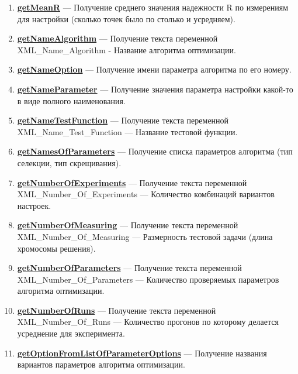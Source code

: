 \documentclass[a4paper,12pt]{article}
\begin{document}
\begin{enumerate}
	\item \textbf{\hyperref[getMeanR]{getMeanR}} --- Получение среднего значения надежности R по измерениям для настройки (сколько точек было по столько и усредняем).
	
	\item \textbf{\hyperref[getNameAlgorithm]{getNameAlgorithm}} --- Получение текста переменной  XML\_Name\_Algorithm - Название алгоритма оптимизации.
	
	\item \textbf{\hyperref[getNameOption]{getNameOption}} --- Получение имени параметра алгоритма по его номеру.
	
	\item \textbf{\hyperref[getNameParameter]{getNameParameter}} --- Получение значения параметра настройки какой-то в виде полного наименования.
	
	\item \textbf{\hyperref[getNameTestFunction]{getNameTestFunction}} --- Получение текста переменной  XML\_Name\_Test\_Function --- Название тестовой функции.
	
	\item \textbf{\hyperref[getNamesOfParameters]{getNamesOfParameters}} --- Получение списка параметров алгоритма (тип селекции, тип скрещивания).
	
	\item \textbf{\hyperref[getNumberOfExperiments]{getNumberOfExperiments}} --- Получение текста переменной  XML\_Number\_Of\_Experiments --- Количество комбинаций вариантов настроек.
	
	\item \textbf{\hyperref[getNumberOfMeasuring]{getNumberOfMeasuring}} --- Получение текста переменной  XML\_Number\_Of\_Measuring --- Размерность тестовой задачи (длина хромосомы решения).
	
	\item \textbf{\hyperref[getNumberOfParameters]{getNumberOfParameters}} --- Получение текста переменной  XML\_Number\_Of\_Parameters --- Количество проверяемых параметров алгоритма оптимизации.
	
	\item \textbf{\hyperref[getNumberOfRuns]{getNumberOfRuns}} --- Получение текста переменной  XML\_Number\_Of\_Runs --- Количество прогонов по которому делается усреднение для эксперимента.
	
	\item \textbf{\hyperref[getOptionFromListOfParameterOptions]{getOptionFromListOfParameterOptions}} --- Получение названия вариантов параметров алгоритма оптимизации.
	

\end{enumerate}
\end{document}

